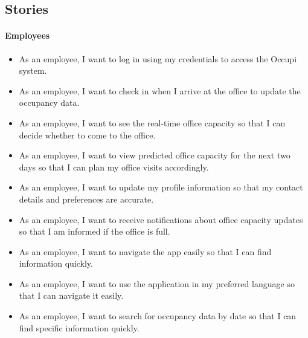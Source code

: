 \documentclass[11pt,a4paper]{article}
\begin{document}
\pagebreak

\subsection*{Stories}

\paragraph{Employees}
\begin{itemize}
    \item As an employee, I want to log in using my credentials to access the Occupi system.
    \item As an employee, I want to check in when I arrive at the office to update the occupancy data.
    \item As an employee, I want to see the real-time office capacity so that I can decide whether to come to the office.
    \item As an employee, I want to view predicted office capacity for the next two days so that I can plan my office visits accordingly.
    \item As an employee, I want to update my profile information so that my contact details and preferences are accurate.
    \item As an employee, I want to receive notifications about office capacity updates so that I am informed if the office is full.
    \item As an employee, I want to navigate the app easily so that I can find information quickly.
    \item As an employee, I want to use the application in my preferred language so that I can navigate it easily.
    \item As an employee, I want to search for occupancy data by date so that I can find specific information quickly.
\end{itemize}
\end{document}
